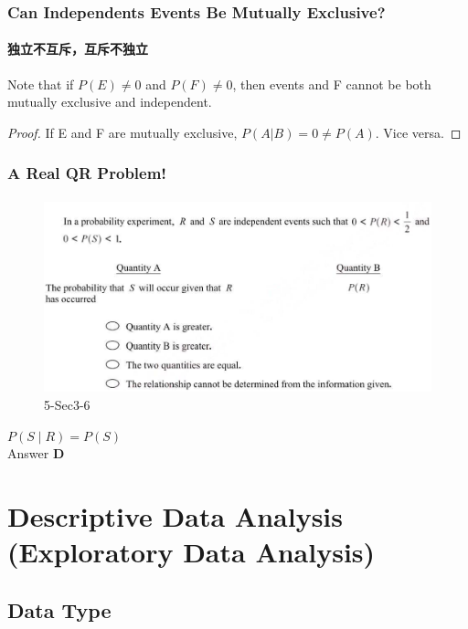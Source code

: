 \documentclass[
	11pt, %
]{beamer}
\begin{document}

\begin{frame}
	\frametitle{Can Independents Events Be Mutually Exclusive? }
	\framesubtitle{独立不互斥，互斥不独立}
	\begin{theorem}
Note that if $P(E) \neq 0 $ and $P(F) \neq 0$, then events  and F cannot be
both mutually exclusive and independent.		
	\end{theorem}
	\pause
	\begin{proof}
		If E and F are mutually exclusive, $P(A|B) = 0 \neq P(A) $. Vice versa. 
	\end{proof}
\end{frame}


\begin{frame}
	\frametitle{A Real QR Problem!}
	\framesubtitle{}
	\begin{figure}
		\includegraphics[width=0.8\linewidth]{Independent_Example_Question1.png}
		\caption{5-Sec3-6}
	\end{figure}
	\pause
$P(S\mid R) = P(S)$ \\
\pause
\bigskip
Answer \textbf{D} 
\end{frame}


\section{Descriptive Data Analysis (Exploratory Data Analysis)}




\subsection{Data Type}
\end{document}
